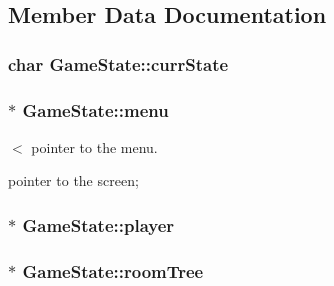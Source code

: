 \subsection{Member Data Documentation}
\hypertarget{classGameState_a541915faaaac7068797345cce53deb9c}{
\subsubsection[{curr\-State}]{\setlength{\rightskip}{0pt plus 5cm}char Game\-State\-::curr\-State\hspace{0.3cm}{\ttfamily [protected]}}}\label{classGameState_a541915faaaac7068797345cce53deb9c}
\hypertarget{classGameState_aebc12d6e90edfbe51a571858f6288f93}{
\subsubsection[{menu}]{$\ast$ Game\-State\-::menu\hspace{0.3cm}{\ttfamily [protected]}}}\label{classGameState_aebc12d6e90edfbe51a571858f6288f93}


$<$ pointer to the menu. 

pointer to the screen; \hypertarget{classGameState_a580b319e1866f1bb79328c7d09581bdf}{
\subsubsection[{player}]{$\ast$ Game\-State\-::player\hspace{0.3cm}{\ttfamily [protected]}}}\label{classGameState_a580b319e1866f1bb79328c7d09581bdf}
\hypertarget{classGameState_acf694139ba8388f8258eeffdb75f0c3b}{
\subsubsection[{room\-Tree}]{$\ast$ Game\-State\-::room\-Tree\hspace{0.3cm}{\ttfamily [protected]}}}\label{classGameState_acf694139ba8388f8258eeffdb75f0c3b}


